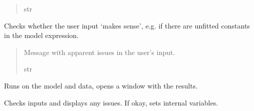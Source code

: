 \documentclass[letterpaper,10pt,english]{sphinxmanual}
\begin{document}
\begin{fulllineitems}
\begin{fulllineitems}
\begin{quote}
\begin{description}
\sphinxAtStartPar
str

\end{description}\end{quote}

\end{fulllineitems}


\begin{fulllineitems}
\label{\detokenize{CTkInterface:src.CTkInterface.MainApp.check_inputs_sensible}}
\pysigstartsignatures
{}
\pysigstopsignatures
\sphinxAtStartPar
Checks whether the user input ‘makes sense’, e.g. if there are unfitted constants in the
model expression.
\begin{quote}\begin{description}
\sphinxAtStartPar
Message with apparent issues in the user’s input.

\sphinxAtStartPar
str

\end{description}\end{quote}

\end{fulllineitems}


\begin{fulllineitems}
\label{\detokenize{CTkInterface:src.CTkInterface.MainApp.compute_params}}
\pysigstartsignatures
{}
\pysigstopsignatures
\sphinxAtStartPar
Runs  on the model and data, opens a window with the results.

\end{fulllineitems}


\begin{fulllineitems}
\label{\detokenize{CTkInterface:src.CTkInterface.MainApp.confirm_input}}
\pysigstartsignatures
{}
\pysigstopsignatures
\sphinxAtStartPar
Checks inputs and displays any issues. If okay, sets internal variables.


\end{fulllineitems}
\end{fulllineitems}
\end{document}
